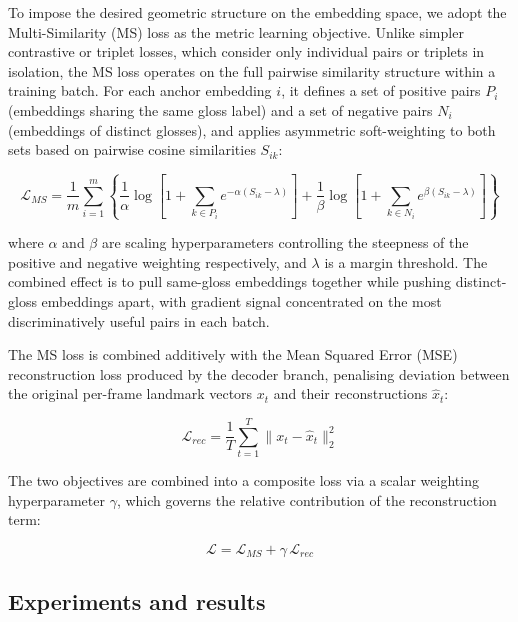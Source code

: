 To impose the desired geometric structure on the embedding space, we adopt the
Multi-Similarity (MS) loss \cite{wang2019msloss} as the metric learning
objective. Unlike simpler contrastive or triplet losses, which consider only
individual pairs or triplets in isolation, the MS loss operates on the full
pairwise similarity structure within a training batch. For each anchor
embedding $i$, it defines a set of positive pairs $P_i$ (embeddings sharing the
same gloss label) and a set of negative pairs $N_i$ (embeddings of distinct
glosses), and applies asymmetric soft-weighting to both sets based on pairwise
cosine similarities $S_{ik}$:

\begin{equation}
  \mathcal{L}_{MS} = \frac{1}{m}\sum_{i=1}^{m}\left\{
    \frac{1}{\alpha}\log\!\left[1+\sum_{k\in P_i}e^{-\alpha(S_{ik}-\lambda)}\right]
  + \frac{1}{\beta}\log\!\left[1+\sum_{k\in N_i}e^{\beta(S_{ik}-\lambda)}\right]
  \right\}
  \label{eq:ms-loss}
\end{equation}

where $\alpha$ and $\beta$ are scaling hyperparameters controlling the
steepness of the positive and negative weighting respectively, and $\lambda$ is
a margin threshold. The combined effect is to pull same-gloss embeddings
together while pushing distinct-gloss embeddings apart, with gradient signal
concentrated on the most discriminatively useful pairs in each batch.

The MS loss is combined additively with the Mean Squared Error (MSE)
reconstruction loss produced by the decoder branch, penalising deviation
between the original per-frame landmark vectors $x_t$ and their
reconstructions $\hat{x}_t$:

\begin{equation}
  \mathcal{L}_{rec} = \frac{1}{T}\sum_{t=1}^{T} \lVert x_t - \hat{x}_t \rVert_2^2
  \label{eq:mse-loss}
\end{equation}

The two objectives are combined into a composite loss via a scalar weighting
hyperparameter $\gamma$, which governs the relative contribution of the
reconstruction term:

\begin{equation}
  \mathcal{L} = \mathcal{L}_{MS} + \gamma\, \mathcal{L}_{rec}
  \label{eq:composite-loss}
\end{equation}

\subsection{Experiments and results}
\label{sec:gloss-recognition-experiments}


